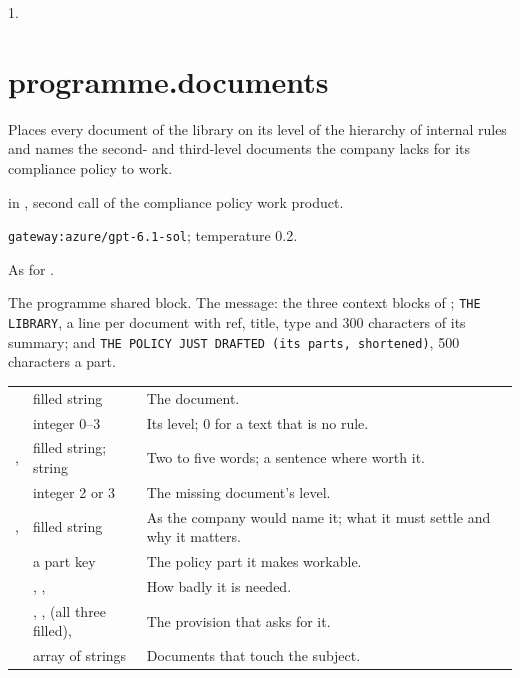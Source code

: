  1.


\section{programme.documents}\label{sec:aprompts:programme-documents}

 Places every document of the library on its level of the hierarchy of
internal rules and names the second- and third-level documents the company lacks for its
compliance policy to work.

  in , second call of the
compliance policy work product.

 \texttt{gateway:azure/gpt-6.1-sol}; temperature 0.2.

 As for .

 The programme shared block. The message: the three
context blocks of ; \texttt{THE LIBRARY}, a line per document with ref,
title, type and 300 characters of its summary; and \texttt{THE POLICY JUST DRAFTED (its parts, shortened)}, 500 characters a part.

\par\nopagebreak
\begin{xltabular}{\textwidth}{@{}L{40mm}L{30mm}Y@{}}
\toprule
{} &  &  \\
\midrule
\endhead
\bottomrule
\endlastfoot
{} & filled string & The document. \\
 & integer 0--3 & Its level; 0 for a text that is no rule. \\
,  & filled string; string & Two to five words; a sentence where worth it. \\
 & integer 2 or 3 & The missing document's level. \\
,  & filled string & As the company would name it; what it must settle and why it matters. \\
 & a part key & The policy part it makes workable. \\
 & , ,  & How badly it is needed. \\
 & , ,  (all three filled),  & The provision that asks for it. \\
 & array of strings & Documents that touch the subject. \\
\end{xltabular}

